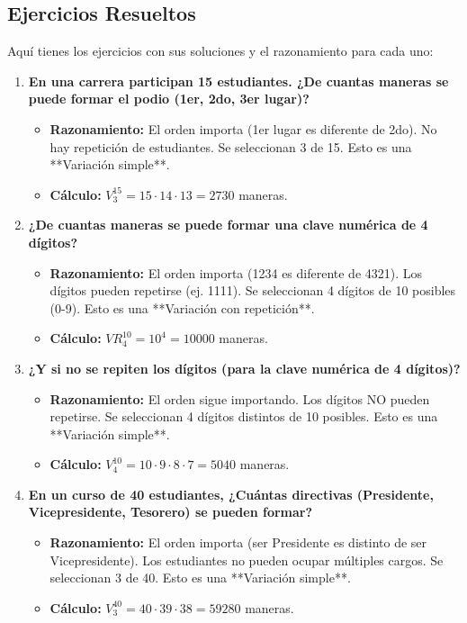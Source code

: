 \documentclass[12pt, letterpaper]{article}
\begin{document}
\subsection*{Ejercicios Resueltos}
Aquí tienes los ejercicios con sus soluciones y el razonamiento para cada uno:
\begin{enumerate}[leftmargin=*,label=\arabic*.]
	\item \textbf{En una carrera participan 15 estudiantes. ¿De cuantas maneras se puede formar el podio (1er, 2do, 3er lugar)?}
	      \begin{itemize}
		      \item \textbf{Razonamiento:} El orden importa (1er lugar es diferente de 2do). No hay repetición de estudiantes. Se seleccionan 3 de 15. Esto es una **Variación simple**.
		      \item \textbf{Cálculo:} $V_3^{15} = 15 \cdot 14 \cdot 13 = 2730$ maneras.
	      \end{itemize}

	\item \textbf{¿De cuantas maneras se puede formar una clave numérica de 4 dígitos?}
	      \begin{itemize}
		      \item \textbf{Razonamiento:} El orden importa (1234 es diferente de 4321). Los dígitos pueden repetirse (ej. 1111). Se seleccionan 4 dígitos de 10 posibles (0-9). Esto es una **Variación con repetición**.
		      \item \textbf{Cálculo:} $VR_4^{10} = 10^4 = 10000$ maneras.
	      \end{itemize}

	\item \textbf{¿Y si no se repiten los dígitos (para la clave numérica de 4 dígitos)?}
	      \begin{itemize}
		      \item \textbf{Razonamiento:} El orden sigue importando. Los dígitos NO pueden repetirse. Se seleccionan 4 dígitos distintos de 10 posibles. Esto es una **Variación simple**.
		      \item \textbf{Cálculo:} $V_4^{10} = 10 \cdot 9 \cdot 8 \cdot 7 = 5040$ maneras.
	      \end{itemize}

	\item \textbf{En un curso de 40 estudiantes, ¿Cuántas directivas (Presidente, Vicepresidente, Tesorero) se pueden formar?}
	      \begin{itemize}
		      \item \textbf{Razonamiento:} El orden importa (ser Presidente es distinto de ser Vicepresidente). Los estudiantes no pueden ocupar múltiples cargos. Se seleccionan 3 de 40. Esto es una **Variación simple**.
		      \item \textbf{Cálculo:} $V_3^{40} = 40 \cdot 39 \cdot 38 = 59280$ maneras.
	      \end{itemize}


\end{enumerate}
\end{document}
